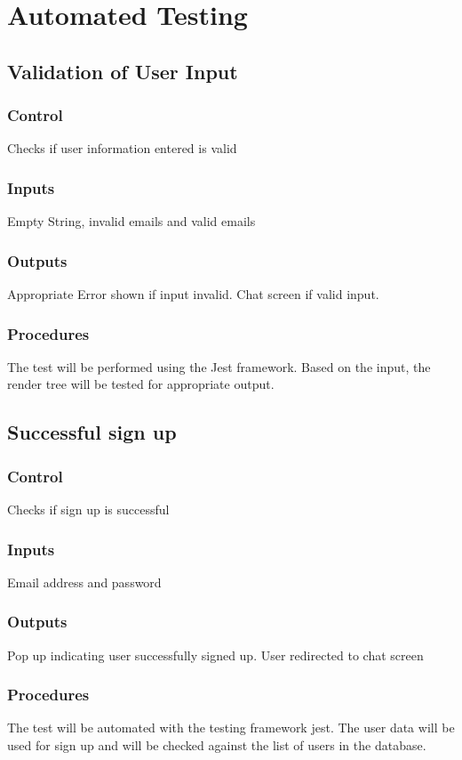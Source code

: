 \documentclass[12pt, titlepage]{article}
\begin{document}
\section{Automated Testing}
\subsection{Validation of User Input}
\subsubsection{Control}
Checks if user information entered is valid
\subsubsection{Inputs}
Empty String, invalid emails and valid emails 
\subsubsection{Outputs}
Appropriate Error shown if input invalid. Chat screen if valid input.
\subsubsection{Procedures}
The test will be performed using the Jest framework. Based on the input, the render tree will be tested for appropriate output.
\subsection{Successful sign up}
\subsubsection{Control}
Checks if sign up is successful
\subsubsection{Inputs}
Email address and password
\subsubsection{Outputs}
Pop up indicating user successfully signed up. User redirected to chat screen
\subsubsection{Procedures}
The test will be automated with the testing framework jest. The user data will be used for sign up and will be checked against the list of users in the database.
\end{document}
